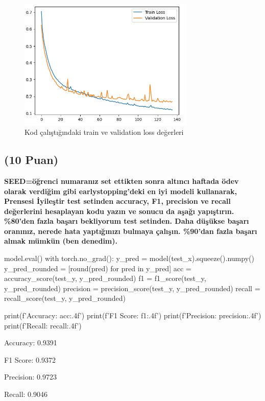 \documentclass[11pt]{article}
\begin{document}
\begin{figure}[ht!]
    \centering
    \includegraphics[width=0.75\textwidth]{learningcurve1}
    \caption{Kod çalıştığındaki train ve validation loss değerleri}
    \label{fig:my_pic}
\end{figure}


\subsection{(10 Puan)} \textbf{SEED=öğrenci numaranız set ettikten sonra altıncı haftada ödev olarak verdiğim gibi earlystopping'deki en iyi modeli kullanarak, Prensesi İyileştir test setinden accuracy, F1, precision ve recall değerlerini hesaplayan kodu yazın ve sonucu da aşağı yapıştırın. \%80'den fazla başarı bekliyorum test setinden. Daha düşükse başarı oranınız, nerede hata yaptığınızı bulmaya çalışın. \%90'dan fazla başarı almak mümkün (ben denedim).}

\begin{python}
model.eval()
with torch.no_grad():
    y_pred = model(test_x).squeeze().numpy()
    y_pred_rounded = [round(pred) for pred in y_pred]
    acc = accuracy_score(test_y, y_pred_rounded)
    f1 = f1_score(test_y, y_pred_rounded)
    precision = precision_score(test_y, y_pred_rounded)
    recall = recall_score(test_y, y_pred_rounded)

print(f'Accuracy: {acc:.4f}')
print(f'F1 Score: {f1:.4f}')
print(f'Precision: {precision:.4f}')
print(f'Recall: {recall:.4f}')
\end{python}

Accuracy: 0.9391

F1 Score: 0.9372

Precision: 0.9723

Recall: 0.9046
\end{document}
